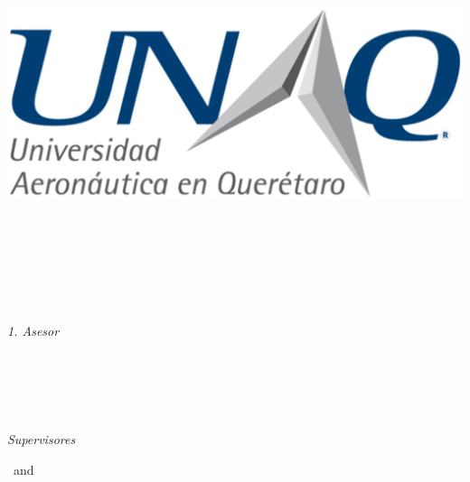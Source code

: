 \begin{titlepage}
	\tgherosfont
	\centering

	{\Large \thesisUniversity} \\[4mm]
	\includegraphics[scale=0.3]{Contenido/Titulo/UNAQ.eps}\\[2mm]
	\textsf{\thesisUniversityDepartment} \\
	\textsf{\thesisUniversityInstitute} \\
	\textsf{\thesisUniversityGroup} \\

	\vfill
	{\large \thesisSubject} \\[5mm]
	{\LARGE \color{ctcolortitle}\textbf{\thesisTitle} \\[10mm]}
	{\Large \thesisName} \\

	\vfill
	\begin{minipage}[t]{.27\textwidth}
		\raggedleft
		\textit{1. Asesor}
	\end{minipage}
	\hspace*{15pt}
	\begin{minipage}[t]{.65\textwidth}
		{\Large \thesisFirstReviewer} \\
	  	{\small \thesisFirstReviewerDepartment} \\[-1mm]
		{\small \thesisFirstReviewerUniversity}
	\end{minipage} \\[5mm]
	\begin{minipage}[t]{.27\textwidth}
		\raggedleft
		\textit{Supervisores}
	\end{minipage}
	\hspace*{15pt}
	\begin{minipage}[t]{.65\textwidth}
		\thesisFirstSupervisor\ and \thesisSecondSupervisor
	\end{minipage} \\[10mm]


\end{titlepage}
